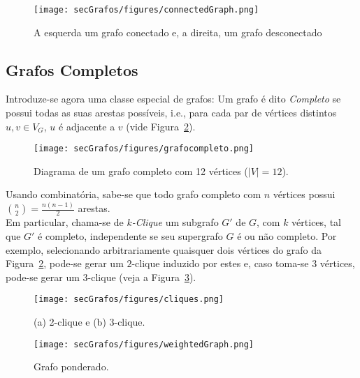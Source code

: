 \begin{figure}[H]
	\begin{center}
		\texttt{[image: secGrafos/figures/connectedGraph.png]}
	\end{center}
	\caption{A esquerda um grafo conectado e, a direita, um grafo desconectado}
	\label{fig:connectGraph}
\end{figure}

\subsection*{Grafos Completos}

Introduze-se agora uma classe especial de grafos: Um grafo é dito \textit{Completo} se possui todas as suas arestas possíveis, i.e., para cada par de vértices distintos $u, v \in V_G$, $u$ é adjacente a $v$ (vide Figura~\ref{fig:grafocompleto}).

\begin{figure}[H]
	\begin{center}
		\texttt{[image: secGrafos/figures/grafocompleto.png]}
	\end{center}
	\caption{Diagrama de um grafo completo com 12 vértices ($|V| = 12$).}
	\label{fig:grafocompleto}
\end{figure}

Usando combinatória, sabe-se que todo grafo completo com $n$ vértices possui ${n \choose 2}=\frac{n(n-1)}{2}$ arestas.
\\

Em particular, chama-se de \textit{$k$-Clique} um subgrafo $G'$ de $G$, com $k$ vértices, tal que $G'$ é completo, independente se seu supergrafo $G$ é ou não completo. Por exemplo, selecionando arbitrariamente quaisquer dois vértices do grafo da Figura~\ref{fig:grafocompleto}, pode-se gerar um $2$-clique induzido por estes e, caso toma-se 3 vértices, pode-se gerar um $3$-clique (veja a Figura~\ref{fig:cliques}).

\begin{minipage}{0.55 \linewidth}
	\begin{figure}[H]
		\begin{center}
			\texttt{[image: secGrafos/figures/cliques.png]}
		\end{center}
		\caption{(a) 2-clique e (b) 3-clique.}
		\label{fig:cliques}
	\end{figure}
\end{minipage}
\hspace{0.1cm}
\begin{minipage}{0.40 \linewidth}
	\begin{figure}[H]
		\begin{center}
			\texttt{[image: secGrafos/figures/weightedGraph.png]}
		\end{center}
		\caption{Grafo ponderado.}
		\label{fig:weightedGraph}
	\end{figure}
\end{minipage}

